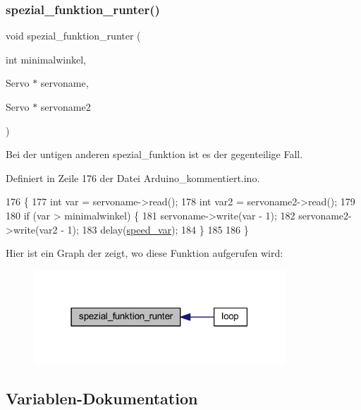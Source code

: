 \subsubsection{\texorpdfstring{spezial\+\_\+funktion\+\_\+runter()}{spezial\_funktion\_runter()}}
{\footnotesize\ttfamily void spezial\+\_\+funktion\+\_\+runter (\begin{DoxyParamCaption}\item[{int}]{minimalwinkel,  }\item[{Servo $\ast$}]{servoname,  }\item[{Servo $\ast$}]{servoname2 }\end{DoxyParamCaption})}



Bei der untigen anderen spezial\+\_\+funktion ist es der gegenteilige Fall. 



Definiert in Zeile 176 der Datei Arduino\+\_\+kommentiert.\+ino.


\begin{DoxyCode}
176                                                                                       \{
177   \textcolor{keywordtype}{int} var = servoname->read();
178   \textcolor{keywordtype}{int} var2 = servoname2->read();
179 
180   \textcolor{keywordflow}{if} (var > minimalwinkel) \{
181     servoname->write(var - 1);
182     servoname2->write(var2 - 1);
183     delay(\hyperlink{_arduino__kommentiert_8ino_a8b03f5396d8e845086daab48dcaca5cb}{speed\_var});
184   \}
185 
186 \}
\end{DoxyCode}
Hier ist ein Graph der zeigt, wo diese Funktion aufgerufen wird\+:\nopagebreak
\begin{figure}[H]
\begin{center}
\leavevmode
\includegraphics[width=267pt]{_arduino__kommentiert_8ino_abf7a5d6cd0eca7c0dacb61f5ef555beb_icgraph}
\end{center}
\end{figure}


\subsection{Variablen-\/\+Dokumentation}
\mbox{\label{_arduino__kommentiert_8ino_a92309e3a6d185d9188757bac49168fe5}} 
